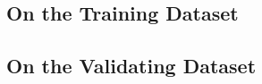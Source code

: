 \subsection{On the Training Dataset}
\label{subsec:on-the-training-dataset}


\subsection{On the Validating Dataset}
\label{subsec:on-the-validating-dataset}
